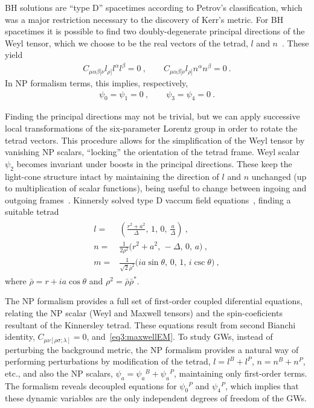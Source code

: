 BH solutions are ``type D'' spacetimes according to Petrov's classification, which was a major restriction necessary to the discovery of Kerr's metric.
For BH spacetimes it is possible to find two doubly-degenerate principal directions of the Weyl tensor, which we choose to be the real vectors of the tetrad, $l$ and $n$~\cite{Chandrasekhar1998}.
These yield
\begin{align}
    C_{\mu\alpha\beta[\nu} l_{\rho]} l^\alpha l^\beta = 0 ~, \qquad C_{\mu\alpha\beta[\nu} l_{\rho]} n^\alpha n^\beta = 0  ~.
\end{align}
In NP formalism terms, this implies, respectively,
\begin{align}
    \psi_0=\psi_1=0 ~,\qquad \psi_3=\psi_4=0 ~.
\end{align}

Finding the principal directions may not be trivial, but we can apply successive local transformations of the six-parameter Lorentz group in order to rotate the tetrad vectors. 
This procedure allows for the simplification of the Weyl tensor by vanishing NP scalars, ``locking'' the orientation of the tetrad frame.
Weyl scalar $\psi_2$ becomes invariant under boosts in the principal directions.
These keep the light-cone structure intact by maintaining the direction of $l$ and $n$ unchanged (up to multiplication of scalar functions), being useful to change between ingoing and outgoing frames~\cite{Teukolsky1974}. 
Kinnersly solved type D vaccum field equations~\cite{Kinnersley1969}, finding a suitable tetrad 
\begin{align}
    \begin{split}
        l =& \left(\frac{r^2+a^2}{\Delta}, \, 1, \,0, \,\frac{a}{\Delta} \right) ~, \\
        n =& \frac{1}{2 \rho^2} \Bigr( r^2+a^2, \,-\Delta, \,0 , \,a \Bigr) ~, \\
        m =& \frac{1}{ \sqrt{2} \bar{\rho}^2 } \Bigr( i a \sin\theta, \,0, \,1, \, i \csc\theta \Bigr) ~,
    \end{split}
    \label{eq3:kinnerslytetrad}
\end{align}
where $\bar{\rho} = r + i a \cos\theta$ and $\rho^2 = \bar{\rho} \bar{\rho}^*$.

The NP formalism provides a full set of first-order coupled diferential equations, relating the NP scalar (Weyl and Maxwell tensors) and the spin-coeficients resultant of the Kinnersley tetrad. These equations result from second Bianchi identity, $C_{\mu\nu[\rho \sigma ; \lambda ]} = 0$, and~\eqref{eq3:maxwellEM}.
To study GWs, instead of perturbing the background metric, the NP formalism provides a natural way of performing perturbations by modification of the tetrad, $l=l^B+l^P$, $n=n^B+n^P$, etc., and also the NP scalars, $\psi_a = \psi_a{}^B + \psi_a{}^P$, maintaining only first-order terms.
The formalism reveals decoupled equations for $\psi_0{}^P$ and $\psi_4{}^P$, which implies that these dynamic variables are the only independent degrees of freedom of the GWs.

